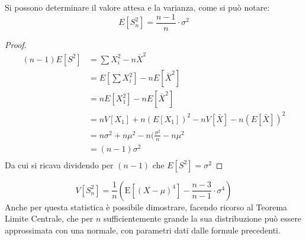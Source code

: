 \documentclass[a4paper,12pt, oneside]{book}
\begin{document}
Si possono determinare il valore attesa e la varianza, come si può notare:
\[E\left[S_{n}^{2}\right] = \frac{n-1}{n} \cdot \sigma^{2} \]
\begin{proof}
    \[ \begin{split}
        (n - 1)E[S^2] & = \sum X_i^2 - n\bar{X}^2 \\
                      & = E[\sum X_i^2] - nE[\bar{X}^2] \\
                      & = nE[X_1^2] - nE[\bar{X}^2] \\
                      & = nV[X_1] + n(E[X_1])^2 - nV[\bar{X}] - n(E[\bar{X}])^2 \\
                      & = n\sigma^2 + n\mu^2 - n(\frac{\sigma^2}{n} - n\mu^2 \\
                      & = (n - 1) \sigma^2\\
        \end{split} \]
    Da cui si ricava dividendo per $(n - 1)$ che $E[S^2] = \sigma^2$
\end{proof}
\[V\left[S_{n}^{2}\right] = \frac{1}{n}\left(\mathrm{E}\left[(X-\mu)^{4}\right]-\frac{n-3}{n-1} \cdot \sigma^{4}\right) \]
Anche per questa statistica è possibile dimostrare, facendo ricorso al Teorema Limite Centrale, 
che per $n$ sufficientemente grande la sua distribuzione può essere approssimata con una normale,
con parametri dati dalle formule precedenti.
\end{document}
